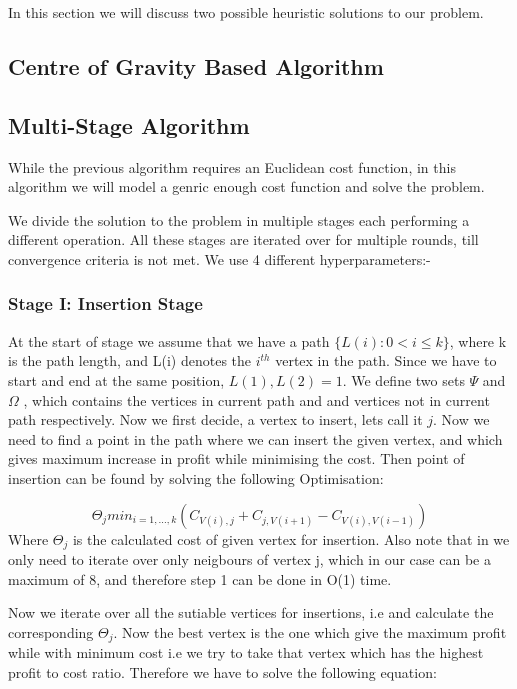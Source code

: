 \documentclass{article}
\begin{document}
In this section we will discuss two possible heuristic solutions to our problem. 

\subsection{Centre of Gravity Based Algorithm}


\subsection{Multi-Stage Algorithm}

While the previous algorithm requires an Euclidean cost function, in this algorithm we will model a genric enough cost function and solve the problem.

We divide the solution to the problem in multiple stages each performing a different operation. All these stages are iterated over for multiple rounds, till convergence criteria is not met.
We use 4 different hyperparameters:- %

\subsubsection{Stage I: Insertion Stage}

At the start of stage we assume that we have a path $\{L(i) : 0<i \leq k\}$, where k is the path length, and L(i) denotes the $i^{th}$ vertex in the path.
Since we have to start and end at the same position,
$L(1),L(2) = 1$.
We define two sets $\Psi$ and $\Omega$
 , which contains the vertices in current path and and vertices not in current path respectively.
Now we first decide, a vertex to insert, lets call it $j$. Now we need to find a point in the path where we can insert the given vertex, and which gives maximum increase in profit while minimising the cost.
Then point of insertion can be found by solving the following Optimisation:

\begin{equation} \label{eq2}
   \Theta_{j} min_{i = 1,\dots,k} ( C_{V(i),j} + C_{j,V(i+1)} - C_{V(i),V(i-1)} )
\end{equation}
Where $\Theta_{j}$ is the calculated cost of given vertex for insertion.
Also note that in  we only need to iterate over only neigbours of vertex j, which in our case can be a maximum of 8, and therefore step 1 can be done in O(1) time.

Now we iterate over all the sutiable vertices for insertions, i.e and calculate the corresponding
$\Theta_{j}$. Now the best vertex is the one which give the maximum profit while with minimum cost i.e we try to take that vertex which has the highest profit to cost ratio.
Therefore we have to solve the following equation:
\end{document}
